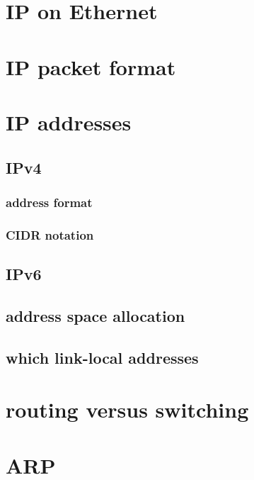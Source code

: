 \section{IP on Ethernet}


\section{IP packet format}


\section{IP addresses}

\subsection{IPv4}
\subsubsection{address format}


\subsubsection{CIDR notation}


\subsection{IPv6}


\subsection{address space allocation}


\subsection{which link-local addresses}



\section{routing versus switching}




\section{ARP}

